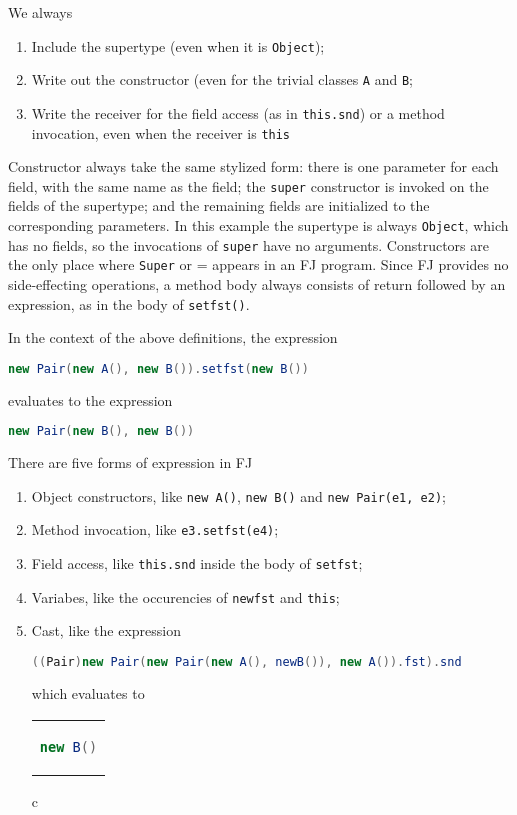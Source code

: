 We always
\begin{enumerate}
    \item Include the supertype (even when it is \texttt{Object});
    \item Write out the constructor (even for the trivial classes \texttt{A} and \texttt{B}; 
    \item Write the receiver for the field access (as in \texttt{this.snd}) or a method invocation, even when the receiver is \texttt{this}
\end{enumerate}
Constructor always take the same stylized form: there is one parameter for each
field, with the same name as the field; the \texttt{super} constructor is
invoked on the fields of the supertype; and the remaining fields are
initialized to the corresponding parameters. In this example the supertype is
always \texttt{Object}, which has no fields, so the invocations of
\texttt{super} have no arguments. Constructors are the only place where
\texttt{Super} or = appears in an FJ program. Since FJ provides no
side-effecting operations, a method body always consists of return followed by
an expression, as in the body of \texttt{setfst()}.

In the context of the above definitions, the expression
\begin{alltt}
    \begin{lstlisting}[language=Java]
        new Pair(new A(), new B()).setfst(new B())
    \end{lstlisting}
\end{alltt}
evaluates to the expression
\begin{alltt}
    \begin{lstlisting}[language=Java]
        new Pair(new B(), new B())
    \end{lstlisting}
\end{alltt}

There are five forms of expression in FJ
\begin{enumerate}
\item Object constructors, like \texttt{new A()}, \texttt{new B()} and \texttt{new Pair(e1, e2)};
\item Method invocation, like \texttt{e3.setfst(e4)};
\item Field access, like \texttt{this.snd} inside the body of \texttt{setfst};
\item Variabes, like the occurencies of \texttt{newfst} and \texttt{this};
\item Cast, like the expression %
\begin{lstlisting}[language=Java]
((Pair)new Pair(new Pair(new A(), newB()), new A()).fst).snd 
\end{lstlisting}
which evaluates to
\begin{center}
\begin{tabular}{c}
\begin{lstlisting}[language=Java]
new B()
\end{lstlisting}
\end{tabular}{c}
\end{center}
\end{enumerate} 

